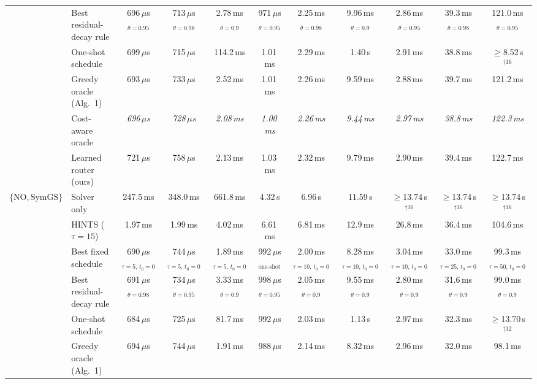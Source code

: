 {\begin{tabular}{llccccccccc}
 & Best residual-decay rule & 696\,$\mu$s$_{\theta{=}0.95}$ & 713\,$\mu$s$_{\theta{=}0.98}$ & 2.78\,ms$_{\theta{=}0.9}$ & 971\,$\mu$s$_{\theta{=}0.95}$ & 2.25\,ms$_{\theta{=}0.98}$ & 9.96\,ms$_{\theta{=}0.9}$ & 2.86\,ms$_{\theta{=}0.95}$ & 39.3\,ms$_{\theta{=}0.98}$ & 121.0\,ms$_{\theta{=}0.95}$ \\
 & One-shot schedule & 699\,$\mu$s & 715\,$\mu$s & 114.2\,ms & 1.01\,ms & 2.29\,ms & 1.40\,s & 2.91\,ms & 38.8\,ms & $\geq$8.52\,s$^{\dagger 16}$ \\
 & Greedy oracle (Alg.~1) & 693\,$\mu$s & 733\,$\mu$s & 2.52\,ms & 1.01\,ms & 2.26\,ms & 9.59\,ms & 2.88\,ms & 39.7\,ms & 121.2\,ms \\
 & Cost-aware oracle & \textit{696\,$\mu$s} & \textit{728\,$\mu$s} & \textit{2.08\,ms} & \textit{1.00\,ms} & \textit{2.26\,ms} & \textit{9.44\,ms} & \textit{2.97\,ms} & \textit{38.8\,ms} & \textit{122.3\,ms} \\
 & Learned router (ours) & 721\,$\mu$s & 758\,$\mu$s & 2.13\,ms & 1.03\,ms & 2.32\,ms & 9.79\,ms & 2.90\,ms & 39.4\,ms & 122.7\,ms \\
\midrule
$\{\mathrm{NO}, \text{SymGS}\}$ & Solver only & 247.5\,ms & 348.0\,ms & 661.8\,ms & 4.32\,s & 6.96\,s & 11.59\,s & $\geq$13.74\,s$^{\dagger 16}$ & $\geq$13.74\,s$^{\dagger 16}$ & $\geq$13.74\,s$^{\dagger 16}$ \\
 & HINTS ($\tau{=}15$) & 1.97\,ms & 1.99\,ms & 4.02\,ms & 6.61\,ms & 6.81\,ms & 12.9\,ms & 26.8\,ms & 36.4\,ms & 104.6\,ms \\
 & Best fixed schedule & 690\,$\mu$s$_{\tau{=}5,\,t_0{=}0}$ & 744\,$\mu$s$_{\tau{=}5,\,t_0{=}0}$ & 1.89\,ms$_{\tau{=}5,\,t_0{=}0}$ & 992\,$\mu$s$_{\text{one-shot}}$ & 2.00\,ms$_{\tau{=}10,\,t_0{=}0}$ & 8.28\,ms$_{\tau{=}10,\,t_0{=}0}$ & 3.04\,ms$_{\tau{=}10,\,t_0{=}0}$ & 33.0\,ms$_{\tau{=}25,\,t_0{=}0}$ & 99.3\,ms$_{\tau{=}50,\,t_0{=}0}$ \\
 & Best residual-decay rule & 691\,$\mu$s$_{\theta{=}0.98}$ & 734\,$\mu$s$_{\theta{=}0.95}$ & 3.33\,ms$_{\theta{=}0.9}$ & 998\,$\mu$s$_{\theta{=}0.95}$ & 2.05\,ms$_{\theta{=}0.9}$ & 9.55\,ms$_{\theta{=}0.9}$ & 2.80\,ms$_{\theta{=}0.9}$ & 31.6\,ms$_{\theta{=}0.9}$ & 99.0\,ms$_{\theta{=}0.9}$ \\
 & One-shot schedule & 684\,$\mu$s & 725\,$\mu$s & 81.7\,ms & 992\,$\mu$s & 2.03\,ms & 1.13\,s & 2.97\,ms & 32.3\,ms & $\geq$13.70\,s$^{\dagger 12}$ \\
 & Greedy oracle (Alg.~1) & 694\,$\mu$s & 744\,$\mu$s & 1.91\,ms & 988\,$\mu$s & 2.14\,ms & 8.32\,ms & 2.96\,ms & 32.0\,ms & 98.1\,ms \\

\end{tabular}}
